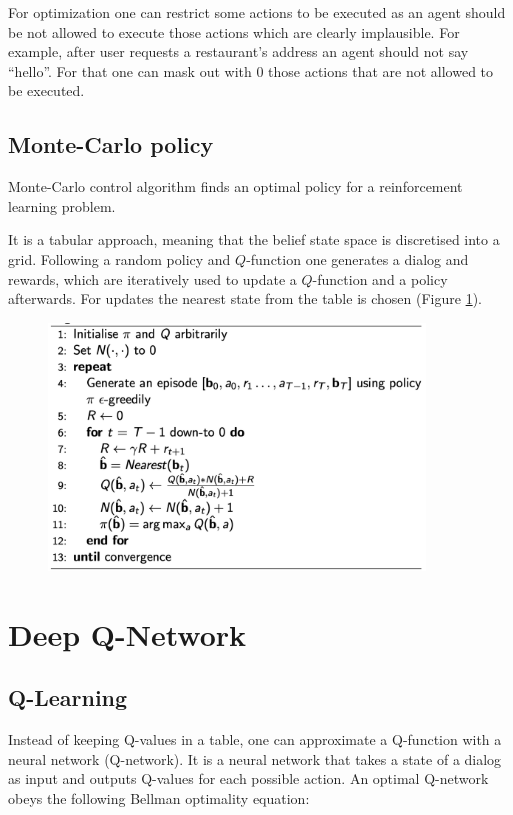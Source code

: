 \documentclass[12pt,titlepage,a4paper]{article}
\begin{document}
For optimization one can restrict some actions to be executed as an agent should be not allowed to execute those actions which are clearly implausible. For example, after user requests a restaurant's address an agent should not say ``hello”. For that one can mask out with 0 those actions that are not allowed to be executed.

\subsection{Monte-Carlo policy}

Monte-Carlo control algorithm finds an optimal policy for a reinforcement learning problem.

It is a tabular approach, meaning that the belief state space is discretised into a grid. Following a random policy and $Q$-function one generates a dialog and rewards, which are iteratively used to update a $Q$-function and a policy afterwards. For updates the nearest state from the table is chosen (Figure \ref{fig:MCC}). 

\begin{figure}[!h]
    \centering
    \includegraphics[width=10cm]{MCC.png}
    \caption{}
    \label{fig:MCC}
\end{figure}


\pagebreak


\section{Deep Q-Network}

\subsection{Q-Learning}
Instead of keeping Q-values in a table, one can approximate a Q-function with a neural network (Q-network). It is a neural network that takes a state of a dialog as input and outputs Q-values for each possible action. An optimal Q-network obeys the following Bellman optimality equation: 
\end{document}
